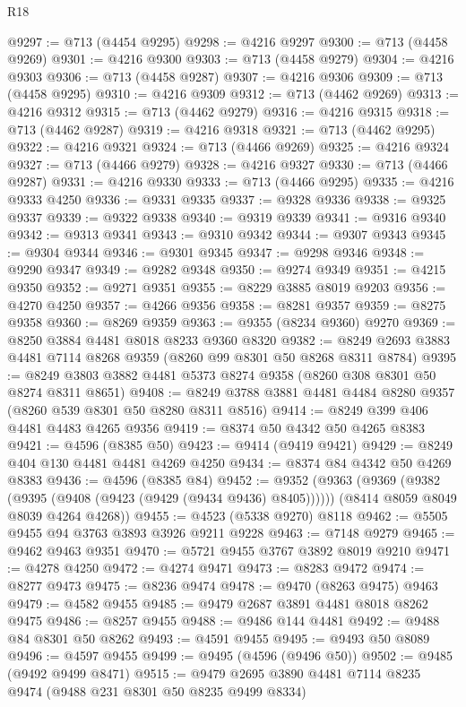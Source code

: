 \begin{lexlean}{R18}
\begin{coremodule}
@9297 := @713 (@4454 @9295)
@9298 := @4216 @9297
@9300 := @713 (@4458 @9269)
@9301 := @4216 @9300
@9303 := @713 (@4458 @9279)
@9304 := @4216 @9303
@9306 := @713 (@4458 @9287)
@9307 := @4216 @9306
@9309 := @713 (@4458 @9295)
@9310 := @4216 @9309
@9312 := @713 (@4462 @9269)
@9313 := @4216 @9312
@9315 := @713 (@4462 @9279)
@9316 := @4216 @9315
@9318 := @713 (@4462 @9287)
@9319 := @4216 @9318
@9321 := @713 (@4462 @9295)
@9322 := @4216 @9321
@9324 := @713 (@4466 @9269)
@9325 := @4216 @9324
@9327 := @713 (@4466 @9279)
@9328 := @4216 @9327
@9330 := @713 (@4466 @9287)
@9331 := @4216 @9330
@9333 := @713 (@4466 @9295)
@9335 := @4216 @9333 @4250
@9336 := @9331 @9335
@9337 := @9328 @9336
@9338 := @9325 @9337
@9339 := @9322 @9338
@9340 := @9319 @9339
@9341 := @9316 @9340
@9342 := @9313 @9341
@9343 := @9310 @9342
@9344 := @9307 @9343
@9345 := @9304 @9344
@9346 := @9301 @9345
@9347 := @9298 @9346
@9348 := @9290 @9347
@9349 := @9282 @9348
@9350 := @9274 @9349
@9351 := @4215 @9350
@9352 := @9271 @9351
@9355 := @8229 @3885 @8019 @9203
@9356 := @4270 @4250
@9357 := @4266 @9356
@9358 := @8281 @9357
@9359 := @8275 @9358
@9360 := @8269 @9359
@9363 := @9355 (@8234 @9360) @9270
@9369 := @8250 @3884 @4481 @8018 @8233 @9360 @8320
@9382 := @8249 @2693 @3883 @4481 @7114 @8268 @9359 (@8260 @99 @8301 @50 @8268 @8311 @8784)
@9395 := @8249 @3803 @3882 @4481 @5373 @8274 @9358 (@8260 @308 @8301 @50 @8274 @8311 @8651)
@9408 := @8249 @3788 @3881 @4481 @4484 @8280 @9357 (@8260 @539 @8301 @50 @8280 @8311 @8516)
@9414 := @8249 @399 @406 @4481 @4483 @4265 @9356
@9419 := @8374 @50 @4342 @50 @4265 @8383
@9421 := @4596 (@8385 @50)
@9423 := @9414 (@9419 @9421)
@9429 := @8249 @404 @130 @4481 @4481 @4269 @4250
@9434 := @8374 @84 @4342 @50 @4269 @8383
@9436 := @4596 (@8385 @84)
@9452 := @9352
    (@9363
      (@9369 (@9382 (@9395 (@9408 (@9423 (@9429 (@9434 @9436) @8405))))))
      (@8414 @8059 @8049 @8039 @4264 @4268))
@9455 := @4523 (@5338 @9270) @8118
@9462 := @5505 @9455 @94 @3763 @3893 @3926 @9211 @9228
@9463 := @7148 @9279
@9465 := @9462 @9463 @9351
@9470 := @5721 @9455 @3767 @3892 @8019 @9210
@9471 := @4278 @4250
@9472 := @4274 @9471
@9473 := @8283 @9472
@9474 := @8277 @9473
@9475 := @8236 @9474
@9478 := @9470 (@8263 @9475) @9463
@9479 := @4582 @9455
@9485 := @9479 @2687 @3891 @4481 @8018 @8262 @9475
@9486 := @8257 @9455
@9488 := @9486 @144 @4481
@9492 := @9488 @84 @8301 @50 @8262
@9493 := @4591 @9455
@9495 := @9493 @50 @8089
@9496 := @4597 @9455
@9499 := @9495 (@4596 (@9496 @50))
@9502 := @9485 (@9492 @9499 @8471)
@9515 := @9479 @2695 @3890 @4481 @7114 @8235 @9474 (@9488 @231 @8301 @50 @8235 @9499 @8334)

\end{coremodule}
\end{lexlean}
